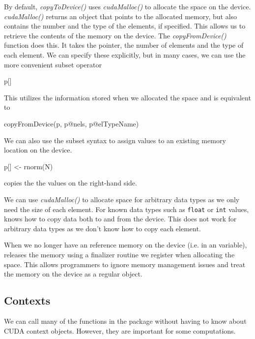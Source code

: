 \documentclass[article]{jss}
\def\R{\proglang{R}}
\def\Rpkg#1{\pkg{#1}}
\def\Rfunc#1{\textsl{#1()}}
\def\Ctype#1{\texttt{#1}}
\begin{document}
By default, \Rfunc{copyToDevice} uses \Rfunc{cudaMalloc} to allocate
the space on the device.  \Rfunc{cudaMalloc} returns an object that
points to the allocated memory, but also contains the number and the
type of the elements, if specified.  This allows us to retrieve the
contents of the memory on the device.  The \Rfunc{copyFromDevice}
function does this.  It takes the pointer, the number of elements and
the type of each element.
We can specify these explicitly, but in many cases, we can use the 
more convenient  subset operator
\begin{RCode}
p[]
\end{RCode}
This utilizes the information stored when we allocated the space and
is equivalent to 
\begin{RCode}
copyFromDevice(p, p@nels, p@elTypeName)
\end{RCode}

We can also use the subset syntax to assign values to an existing
memory location on the device. 
\begin{RCode}
p[] <- rnorm(N)
\end{RCode}
copies the the values on the right-hand side.

We can use \Rfunc{cudaMalloc} to allocate space for arbitrary data
types as we only need the size of each element.  For known data types
such as \Ctype{float} or \Ctype{int} values, \Rpkg{RCUDA} knows how to
copy data both to and from the device.  This does not work for
arbitrary data types as we don't know how to copy each element.


When we no longer have an \R{} reference memory on the device (i.e. in
an \R{} variable), \R{} releases the memory using a finalizer routine
we register when allocating the space.  This allows \R{} programmers
to ignore memory management issues and treat the memory on the device
as a regular \R{} object.



\subsection{Contexts}
We can call many of the functions in the \Rpkg{RCUDA}  package
without having to know about CUDA context objects.
However, they are important for some computations.
\end{document}
